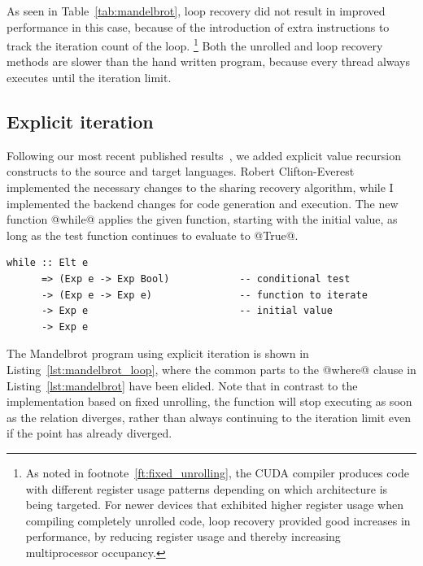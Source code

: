 As seen in Table~\ref{tab:mandelbrot}, loop recovery did not result in improved
performance in this case, because of the introduction of extra instructions to
track the iteration count of the loop.%
\footnote{As noted in footnote~\ref{ft:fixed_unrolling}, the CUDA compiler
produces code with different register usage patterns depending on which
architecture is being targeted. For newer devices that exhibited higher register
usage when compiling completely unrolled code, loop recovery provided good
increases in performance, by reducing register usage and thereby increasing
multiprocessor occupancy.}
Both the unrolled and loop recovery methods are slower than the hand written
program, because every thread always executes until the iteration limit.



\subsection{Explicit iteration}

Following our most recent published results~\cite{McDonell:2013wi}, we added
explicit value recursion constructs to the source and target languages. Robert
Clifton-Everest implemented the necessary changes to the sharing recovery
algorithm, while I implemented the backend changes for code generation and
execution. The new function @while@ applies the given function, starting with
the initial value, as long as the test function continues to evaluate to @True@.
%
\begin{lstlisting}[style=haskell]
while :: Elt e
      => (Exp e -> Exp Bool)            -- conditional test
      -> (Exp e -> Exp e)               -- function to iterate
      -> Exp e                          -- initial value
      -> Exp e
\end{lstlisting}
%
The Mandelbrot program using explicit iteration is shown in
Listing~\ref{lst:mandelbrot_loop}, where the common parts to the @where@ clause
in Listing~\ref{lst:mandelbrot} have been elided. Note that in contrast to the
implementation based on fixed unrolling, the function will stop executing as
soon as the relation diverges, rather than always continuing to the iteration
limit even if the point has already diverged.

